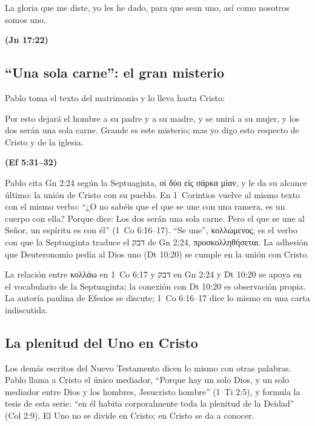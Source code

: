 \documentclass[11pt,letterpaper]{article}
\newcommand{\heb}[1]{\mbox{\foreignlanguage{hebrew}{#1}}}
\newcommand{\grc}[1]{\foreignlanguage{ancientgreek}{#1}}
\newcommand{\fuente}[1]{\par\hfill{\upshape\bfseries\small\textcolor{azul}{#1}}}
\begin{document}
\begin{cita}La gloria que me diste, yo les he dado, para que sean uno, así como nosotros somos uno.\fuente{(Jn 17:22)}\end{cita}

\subsection{``Una sola carne'': el gran misterio}
Pablo toma el texto del matrimonio y lo lleva hasta Cristo:

\begin{cita}Por esto dejará el hombre a su padre y a su madre, y se unirá a su mujer, y los dos serán una sola carne. Grande es este misterio; mas yo digo esto respecto de Cristo y de la iglesia.\fuente{(Ef 5:31--32)}\end{cita}

Pablo cita Gn 2:24 según la Septuaginta, \grc{οἱ δύο εἰς σάρκα μίαν}, y le da su alcance último: la unión de Cristo con su pueblo. En 1~Corintios vuelve al mismo texto con el mismo verbo: ``¿O no sabéis que el que se une con una ramera, es un cuerpo con ella? Porque dice: Los dos serán una sola carne. Pero el que se une al Señor, un espíritu es con él'' (1~Co 6:16--17). ``Se une'', \grc{κολλώμενος}, es el verbo con que la Septuaginta traduce el \heb{דבק} de Gn 2:24, \grc{προσκολληθήσεται}. La adhesión que Deuteronomio pedía al Dios uno (Dt 10:20) se cumple en la unión con Cristo.

\begin{nota}[Precisión]
La relación entre \grc{κολλάω} en 1~Co 6:17 y \heb{דבק} en Gn 2:24 y Dt 10:20 se apoya en el vocabulario de la Septuaginta; la conexión con Dt 10:20 es observación propia. La autoría paulina de Efesios se discute; 1~Co 6:16--17 dice lo mismo en una carta indiscutida.
\end{nota}

\subsection{La plenitud del Uno en Cristo}
Los demás escritos del Nuevo Testamento dicen lo mismo con otras palabras. Pablo llama a Cristo el único mediador, ``Porque hay un solo Dios, y un solo mediador entre Dios y los hombres, Jesucristo hombre'' (1~Ti 2:5), y formula la tesis de esta serie: ``en él habita corporalmente toda la plenitud de la Deidad'' (Col 2:9). El Uno no se divide en Cristo; en Cristo se da a conocer.
\end{document}

